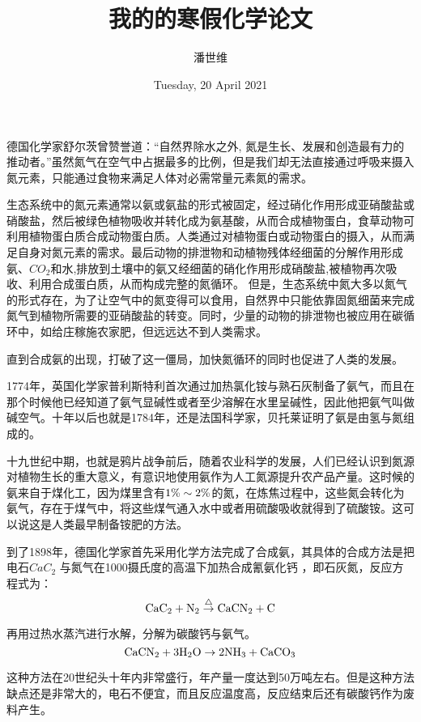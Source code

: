 \documentclass[a4paper,12pt]{article}
\begin{document}
\title {{}\\{\small 我的的寒假化学论文}}
\author{潘世维}
\date{Tuesday, 20 April 2021}
    
\maketitle
 



德国化学家舒尔茨曾赞誉道：“自然界除水之外, 氮是生长、发展和创造最有力的推动者。”虽然氮气在空气中占据最多的比例，但是我们却无法直接通过呼吸来摄入氮元素，只能通过食物来满足人体对必需常量元素氮的需求。

生态系统中的氮元素通常以氨或氨盐的形式被固定，经过硝化作用形成亚硝酸盐或硝酸盐，然后被绿色植物吸收并转化成为氨基酸，从而合成植物蛋白，食草动物可利用植物蛋白质合成动物蛋白质。人类通过对植物蛋白或动物蛋白的摄入，从而满足自身对氮元素的需求。最后动物的排泄物和动植物残体经细菌的分解作用形成氨、$CO_2$和水,排放到土壤中的氨又经细菌的硝化作用形成硝酸盐,被植物再次吸收、利用合成蛋白质，从而构成完整的氮循环。 但是，生态系统中氮大多以氮气的形式存在，为了让空气中的氮变得可以食用，自然界中只能依靠固氮细菌来完成氮气到植物所需要的亚硝酸盐的转变。同时，少量的动物的排泄物也被应用在碳循环中，如给庄稼施农家肥，但远远达不到人类需求。

直到合成氨的出现，打破了这一僵局，加快氮循环的同时也促进了人类的发展。

1774年，英国化学家普利斯特利首次通过加热氯化铵与熟石灰制备了氨气，而且在那个时候他已经知道了氨气显碱性或者至少溶解在水里呈碱性，因此他把氨气叫做碱空气。十年以后也就是1784年，还是法国科学家，贝托莱证明了氨是由氢与氮组成的。

十九世纪中期，也就是鸦片战争前后，随着农业科学的发展，人们已经认识到氮源对植物生长的重大意义，有意识地使用氨作为人工氮源提升农产品产量。这时候的氨来自于煤化工，因为煤里含有$\rm 1\%\sim2\%$的氮，在炼焦过程中，这些氮会转化为氨气，存在于煤气中，将这些煤气通入水中或者用硫酸吸收就得到了硫酸铵。这可以说这是人类最早制备铵肥的方法。

到了1898年，德国化学家首先采用化学方法完成了合成氨，其具体的合成方法是把电石$CaC_2$ 与氮气在1000摄氏度的高温下加热合成氰氨化钙  ，即石灰氮，反应方程式为：
$$
\rm CaC_2 + N_2\overset{\triangle }{\rightarrow}  CaCN_2 + C
$$

再用过热水蒸汽进行水解，分解为碳酸钙与氨气。
$$
\rm CaCN_2+3H_2O \rightarrow2NH_3+CaCO_3
$$

这种方法在20世纪头十年内非常盛行，年产量一度达到50万吨左右。但是这种方法缺点还是非常大的，电石不便宜，而且反应温度高，反应结束后还有碳酸钙作为废料产生。
\end{document}
